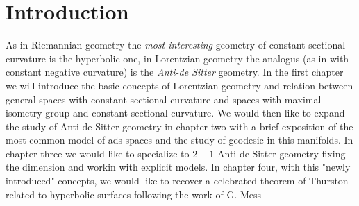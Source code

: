 \chapter{Introduction}

As in Riemannian geometry the \textit{most interesting} geometry of constant sectional curvature is the hyperbolic one, in Lorentzian geometry the analogus (as in with constant negative curvature) is the \textit{Anti-de Sitter} geometry. In the first chapter we will introduce the basic concepts of Lorentzian geometry and relation between general spaces with constant sectional curvature and spaces with maximal isometry group and constant sectional curvature.
We would then like to expand the study of Anti-de Sitter geometry in chapter two with a brief exposition of the most common model of ads spaces and the study of geodesic in this manifolds. 
In chapter three we would like to specialize to $2+1$ Anti-de Sitter geometry fixing the dimension and workin with explicit models. 
In chapter four, with this "newly introduced" concepts, we would like to recover a celebrated theorem of Thurston related to hyperbolic surfaces following the work of G. Mess \cite{Mess}
